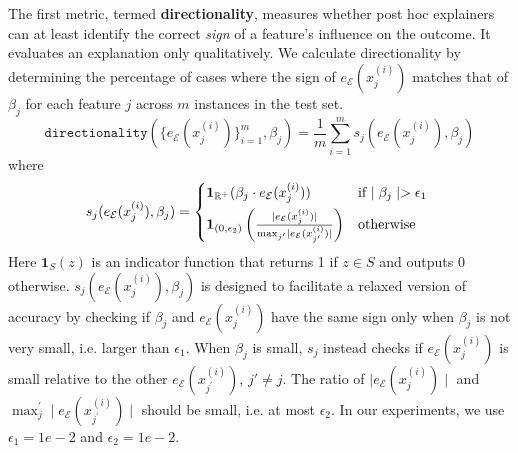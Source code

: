 \documentclass[mnsc,blindrev]{informs3}
\newcommand{\mE}{\mathcal{E}}
\begin{document}
    The first metric, termed \textbf{directionality}, measures whether post hoc explainers can at least identify the correct \textit{sign} of a feature's influence on the outcome. It evaluates an explanation only qualitatively. We calculate directionality by determining the percentage of cases where the sign of $e_\mE(x^{(i)}_j)$ matches that of $\beta_j$ for each feature $j$ across $m$ instances in the test set. %
    \begin{equation}
        \label{eq:acc}
        \texttt{directionality}(\{e_\mE(x^{(i)}_j)\}_{i=1}^m,\beta_j) = \frac{1}{m} \sum_{i=1}^m s_j( e_\mE(x^{(i)}_j),\beta_j)
    \end{equation}
    where 
    \begin{equation*}
        s_j(e_\mE(x^{(i)}_j),\beta_j) = \begin{cases*}
                    \mathbf{1}_{\mathbb{R}^+}(\beta_j \cdot e_\mE(x^{(i)}_j)) & if  $\mid \beta_j\mid > \epsilon_1$  \\
                     \mathbf{1}_{(0,\epsilon_2)}\left(\frac{\mid e_\mE(x^{(i)}_j)\mid }{\max_{j'} \mid e_\mE(x^{(i)}_{j'})\mid}\right) & otherwise
                 \end{cases*}
    \end{equation*}
    Here $\mathbf{1}_S(z)$ is an indicator function that returns 1 if $z\in S$ and outputs 0 otherwise. $s_j(e_\mE(x^{(i)}_j),\beta_j)$ is designed to facilitate a relaxed version of accuracy by checking if  $\beta_j$ and $e_\mE(x^{(i)}_j)$ have the same sign only when $\beta_j$ is not very small, i.e. larger than $\epsilon_1$. When $\beta_j$ is small, $s_j$ instead checks if $e_\mE(x^{(i)}_j)$ is small relative to the other $e_\mE(x^{(i)}_{j^{\prime}})$, $j\prime \neq j$. The ratio of $\mid e_\mE(x^{(i)}_j)\mid $ and $\max_j^\prime \mid e_\mE(x^{(i)}_{j^\prime})\mid$ should be small, i.e. at most $\epsilon_2$.
    In our experiments, we use $\epsilon_1=1e-2$ and $\epsilon_2=1e-2$. 
    
\end{document}

